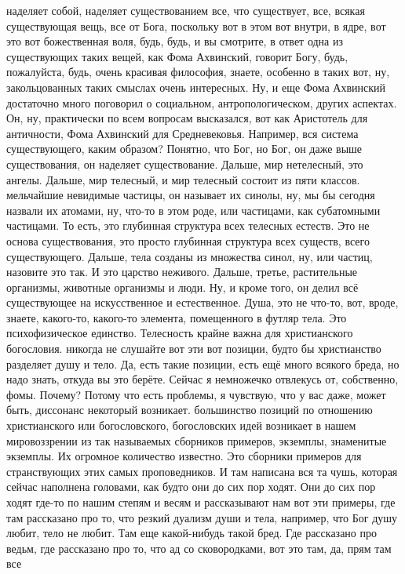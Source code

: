 наделяет собой, наделяет существованием все, что существует, все, всякая
существующая вещь, все от Бога, поскольку вот в этом вот внутри, в ядре, вот это
вот божественная воля, будь, будь, и вы смотрите, в ответ одна из существующих
таких вещей, как Фома Ахвинский, говорит Богу, будь, пожалуйста, будь, очень
красивая философия, знаете, особенно в таких вот, ну, закольцованных таких
смыслах очень интересных. Ну, и еще Фома Ахвинский достаточно много поговорил о
социальном, антропологическом, других аспектах. Он, ну, практически по всем
вопросам высказался, вот как Аристотель для античности, Фома Ахвинский для
Средневековья. Например, вся система существующего, каким образом? Понятно, что
Бог, но Бог, он даже выше существования, он наделяет существование. Дальше, мир
нетелесный, это ангелы. Дальше, мир телесный, и мир телесный состоит из пяти
классов. мельчайшие невидимые частицы, он называет их синолы, ну, мы бы сегодня
назвали их атомами, ну, что-то в этом роде, или частицами, как субатомными
частицами. То есть, это глубинная структура всех телесных естеств. Это не основа
существования, это просто глубинная структура всех существ, всего существующего.
Дальше, тела созданы из множества синол, ну, или частиц, назовите это так. И это
царство неживого. Дальше, третье, растительные организмы, животные организмы и
люди. Ну, и кроме того, он делил всё существующее на искусственное и
естественное. Душа, это не что-то, вот, вроде, знаете, какого-то, какого-то
элемента, помещенного в футляр тела. Это психофизическое единство. Телесность
крайне важна для христианского богословия. никогда не слушайте вот эти вот
позиции, будто бы христианство разделяет душу и тело. Да, есть такие позиции,
есть ещё много всякого бреда, но надо знать, откуда вы это берёте. Сейчас я
немножечко отвлекусь от, собственно, фомы. Почему? Потому что есть проблемы, я
чувствую, что у вас даже, может быть, диссонанс некоторый возникает. большинство
позиций по отношению христианского или богословского, богословских идей
возникает в нашем мировоззрении из так называемых сборников примеров, экземплы,
знаменитые экземплы. Их огромное количество известно. Это сборники примеров для
странствующих этих самых проповедников. И там написана вся та чушь, которая
сейчас наполнена головами, как будто они до сих пор ходят. Они до сих пор ходят
где-то по нашим степям и весям и рассказывают нам вот эти примеры, где там
рассказано про то, что резкий дуализм души и тела, например, что Бог душу любит,
тело не любит. Там еще какой-нибудь такой бред. Где рассказано про ведьм, где
рассказано про то, что ад со сковородками, вот это там, да, прям там все
